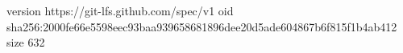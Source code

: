 version https://git-lfs.github.com/spec/v1
oid sha256:2000fe66e5598eec93baa939658681896dee20d5ade604867b6f815f1b4ab412
size 632
